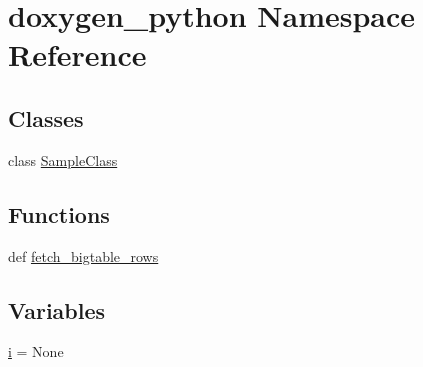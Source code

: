 \hypertarget{namespacedoxygen__python}{\section{doxygen\+\_\+python Namespace Reference}
\label{namespacedoxygen__python}
}
\subsection*{Classes}
\begin{DoxyCompactItemize}
\item 
class \hyperlink{classdoxygen__python_1_1_sample_class}{Sample\+Class}
\end{DoxyCompactItemize}
\subsection*{Functions}
\begin{DoxyCompactItemize}
\item 
def \hyperlink{namespacedoxygen__python_a5c92544fbb20cd4315a7f365b7280bd1}{fetch\+\_\+bigtable\+\_\+rows}
\end{DoxyCompactItemize}
\subsection*{Variables}
\begin{DoxyCompactItemize}
\item 
\hyperlink{namespacedoxygen__python_a2955b270349986df67d20bc386a54b90}{i} = None
\end{DoxyCompactItemize}


